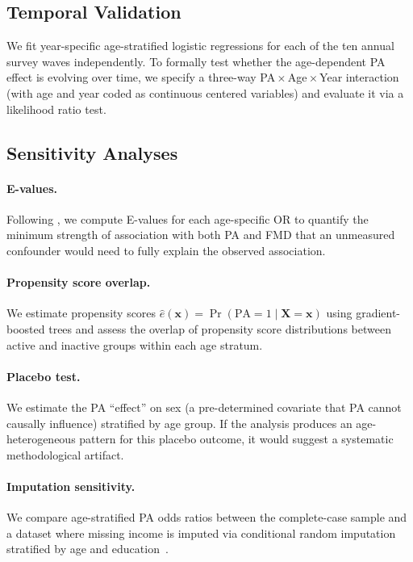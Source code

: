\documentclass[11pt]{article}
\begin{document}
\subsection{Temporal Validation}

We fit year-specific age-stratified logistic regressions for each of the ten annual survey waves independently.
To formally test whether the age-dependent PA effect is evolving over time, we specify a three-way PA\,$\times$\,Age\,$\times$\,Year interaction (with age and year coded as continuous centered variables) and evaluate it via a likelihood ratio test.

\subsection{Sensitivity Analyses}
\label{sec:sensitivity}

\paragraph{E-values.}
Following \citet{vanderweele2017sensitivity}, we compute E-values for each age-specific OR to quantify the minimum strength of association with both PA and FMD that an unmeasured confounder would need to fully explain the observed association.

\paragraph{Propensity score overlap.}
We estimate propensity scores $\hat{e}(\mathbf{x}) = \Pr(\text{PA}=1 \mid \mathbf{X}=\mathbf{x})$ using gradient-boosted trees and assess the overlap of propensity score distributions between active and inactive groups within each age stratum.

\paragraph{Placebo test.}
We estimate the PA ``effect'' on sex (a pre-determined covariate that PA cannot causally influence) stratified by age group.
If the analysis produces an age-heterogeneous pattern for this placebo outcome, it would suggest a systematic methodological artifact.

\paragraph{Imputation sensitivity.}
We compare age-stratified PA odds ratios between the complete-case sample and a dataset where missing income is imputed via conditional random imputation stratified by age and education~\citep{rubin1987multiple}.
\end{document}
